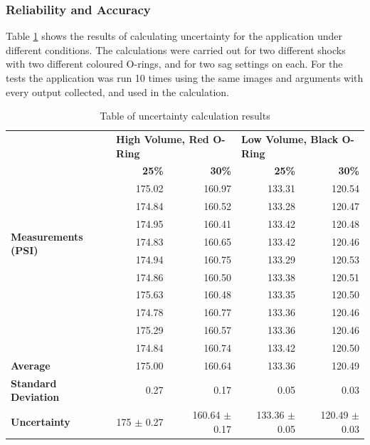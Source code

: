 		\subsubsection{Reliability and Accuracy}
			Table \ref{tab:uncertainty} shows the results of calculating uncertainty for the application under different conditions. The calculations were carried out for two different shocks with two different coloured O-rings, and for two sag settings on each. For the tests the application was run 10 times using the same images and arguments with every output collected, and used in the calculation.
			\begin{table}[h!]
				\centering
				\caption{Table of uncertainty calculation results}
				\label{tab:uncertainty}
				\begin{tabular}{|l|r|r|r|r|}
					\hline
					\multirow{12}{7em}{\bfseries Measurements (PSI)}&\multicolumn{2}{|l|}{\bfseries High Volume, Red O-Ring}&\multicolumn{2}{|l|}{\bfseries Low Volume, Black O-Ring}\\
					\cline{2-5}&\bfseries 25\%&\bfseries 30\%&\bfseries 25\%&\bfseries 30\%\\
					\hline
					&175.02&160.97&133.31&120.54\\
					&174.84&160.52&133.28&120.47\\
					&174.95&160.41&133.42&120.48\\
					&174.83&160.65&133.42&120.46\\
					&174.94&160.75&133.29&120.53\\
					&174.86&160.50&133.38&120.51\\
					&175.63&160.48&133.35&120.50\\
					&174.78&160.77&133.36&120.46\\
					&175.29&160.57&133.36&120.46\\
					&174.84&160.74&133.42&120.50\\
					\hline
					\bfseries Average&175.00&160.64&133.36&120.49\\
					\bfseries Standard Deviation&0.27&0.17&0.05&0.03\\
					\bfseries Uncertainty&175 $\pm$ 0.27&160.64 $\pm$ 0.17&133.36 $\pm$ 0.05&120.49 $\pm$ 0.03\\
					\hline
				\end{tabular}
			\end{table}
			\\
